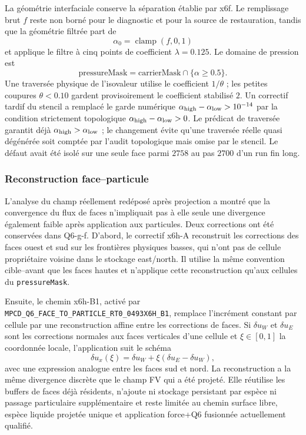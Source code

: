 \documentclass[11pt,a4paper]{article}
\begin{document}
La géométrie interfaciale conserve la séparation établie par x6f. Le remplissage brut $f$ reste non borné pour le diagnostic et pour la source de restauration, tandis que la géométrie filtrée part de
\begin{equation}
  \alpha_0=\operatorname{clamp}(f,0,1)
\end{equation}
et applique le filtre à cinq points de coefficient $\lambda=0.125$. Le domaine de pression est
\begin{equation}
  \text{pressureMask}=\text{carrierMask}\cap\{\alpha\ge0.5\}.
\end{equation}
Une traversée physique de l'isovaleur utilise le coefficient $1/\theta$ ; les petites coupures $\theta<0.10$ gardent provisoirement le coefficient stabilisé $2$. Un correctif tardif du stencil a remplacé le garde numérique $\alpha_{\rm high}-\alpha_{\rm low}>10^{-14}$ par la condition strictement topologique $\alpha_{\rm high}-\alpha_{\rm low}>0$. Le prédicat de traversée garantit déjà $\alpha_{\rm high}>\alpha_{\rm low}$ ; le changement évite qu'une traversée réelle quasi dégénérée soit comptée par l'audit topologique mais omise par le stencil. Le défaut avait été isolé sur une seule face parmi $2758$ au pas $2700$ d'un run fin long.

\subsubsection{Reconstruction face--particule}

L'analyse du champ réellement redéposé après projection a montré que la convergence du flux de faces n'impliquait pas à elle seule une divergence également faible après application aux particules. Deux corrections ont été conservées dans Q6-g-f. D'abord, le correctif x6h-A reconstruit les corrections des faces ouest et sud sur les frontières physiques basses, qui n'ont pas de cellule propriétaire voisine dans le stockage east/north. Il utilise la même convention cible--avant que les faces hautes et n'applique cette reconstruction qu'aux cellules du \texttt{pressureMask}.

Ensuite, le chemin x6h-B1, activé par \texttt{MPCD\_Q6\_FACE\_TO\_PARTICLE\_RT0\_0493X6H\_B1}, remplace l'incrément constant par cellule par une reconstruction affine entre les corrections de faces. Si $\delta u_W$ et $\delta u_E$ sont les corrections normales aux faces verticales d'une cellule et $\xi\in[0,1]$ la coordonnée locale, l'application suit le schéma
\begin{equation}
  \delta u_x(\xi)=\delta u_W+\xi(\delta u_E-\delta u_W),
\end{equation}
avec une expression analogue entre les faces sud et nord. La reconstruction a la même divergence discrète que le champ FV qui a été projeté. Elle réutilise les buffers de faces déjà résidents, n'ajoute ni stockage persistant par espèce ni passage particulaire supplémentaire et reste limitée au chemin surface libre, espèce liquide projetée unique et application force+Q6 fusionnée actuellement qualifié.
\end{document}
